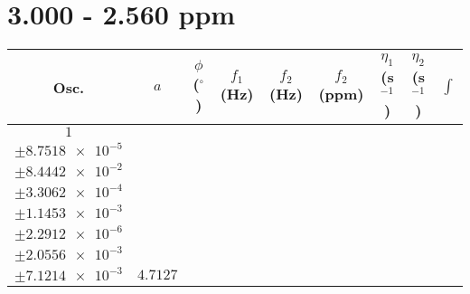 \documentclass[8pt]{article}
\begin{document}
\section*{3.000 - 2.560 ppm}
\begin{longtable}[l]{c c c c c c c c c}
\toprule
Osc. & $a$ & $\phi$ ($^{\circ}$) & $f_1$ (Hz) & $f_2$ (Hz) & $f_2$ (ppm) & $\eta_1$ (s$^{-1}$) & $\eta_2$ (s$^{-1}$) & $\int$\\
\midrule
$\num{1}$ & \begin{tabular}[c]{@{}c@{}}$\num{5.9944e-2}$ \\ $\pm\num{8.7518e-5}$\end{tabular} & \begin{tabular}[c]{@{}c@{}}$\num{-9.2906e-2}$ \\ $\pm\num{8.4442e-2}$\end{tabular} & \begin{tabular}[c]{@{}c@{}}$\num{-12.902}$ \\ $\pm\num{3.3062e-4}$\end{tabular} & \begin{tabular}[c]{@{}c@{}}$\num{1.3215e+3}$ \\ $\pm\num{1.1453e-3}$\end{tabular} & \begin{tabular}[c]{@{}c@{}}$\num{2.6438}$ \\ $\pm\num{2.2912e-6}$\end{tabular} & \begin{tabular}[c]{@{}c@{}}$\num{1.1588}$ \\ $\pm\num{2.0556e-3}$\end{tabular} & \begin{tabular}[c]{@{}c@{}}$\num{4.2168}$ \\ $\pm\num{7.1214e-3}$\end{tabular} & $\num{4.7127}$\\

\end{longtable}
\end{document}
